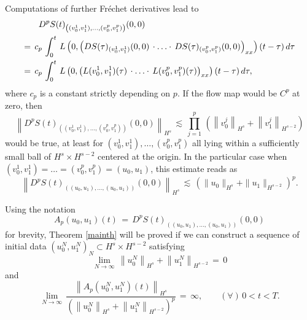 \documentclass{amsart}
\begin{document}
Computations of further Fr\'{e}chet derivatives lead to 
\begin{equation}
\aligned
 D^pS(t)&_{\left((v^1_0,v^1_1),\ldots, (v^p_0,v^p_1)\right)}(0,0)\\
=\,c_p\,\int_0^t\,L& \left( 0,\left(DS(\tau)_{(v^1_0,v^1_1)}(0,0)\,\cdot \ldots\cdot\,DS(\tau)_{(v^p_0,v^p_1)}(0,0)\right)_{xx}\right)(t-\tau)\,d\tau\\
=\,c_p\,\int_0^t\,L& \left( 0,\left(L(v^1_0,v^1_1)(\tau)\,\cdot \ldots\cdot\,L(v^p_0,v^p_1)(\tau)\right)_{xx}\right)(t-\tau)\,d\tau,
\endaligned
\label{dps}
\end{equation}
where $c_p$ is a constant strictly depending on $p$. If the flow map would be $C^p$ at zero, 
then 
\begin{equation}
 \left\|D^pS(t)_{\left((v^1_0,v^1_1),\ldots, (v^p_0,v^p_1)\right)}(0,0)\right\|_{H^s}\,\lesssim\,\prod_{j=1}^{p}\, \left(\left\|v^j_0\right\|_{H^s}+\left\|v^j_1\right\|_{H^{s-2}}\right)
\end{equation}
would be true, at least for $(v^1_0,v^1_1),\ldots, (v^p_0,v^p_1)$ all lying within a sufficiently small ball of $ H^s\times H^{s-2}$ centered at the origin. In the particular case when $(v^1_0,v^1_1)=\ldots= (v^p_0,v^p_1)=(u_0,u_1)$, this estimate reads as
\begin{equation}
 \left\|D^pS(t)_{\left((u_0,u_1),\ldots, (u_0,u_1)\right)}(0,0)\right\|_{H^s}\,\lesssim\,\left(\|u_0\|_{H^s}+\|u_1\|_{H^{s-2}}\right)^p.
\end{equation}

Using the notation
\[
A_p(u_0,u_1)(t)\,=\,D^pS(t)_{\left((u_0,u_1),\ldots, (u_0,u_1)\right)}(0,0)
\]
for brevity, Theorem \ref{mainth} will be proved if we can construct a sequence of initial data $\left(u^N_0,u^N_1\right)_N\subset H^s\times H^{s-2}$ satisfying
\begin{equation}
\lim_{N\to \infty}\, \left\|u_0^N\right\|_{H^{s}} + \left\|u_1^N\right\|_ {H^{s-2}}\,=\,0
\label{ivhs}
\end{equation}
and 
\begin{equation}
\lim_{N\to \infty}\, \frac{\left\|A_{p}(u_0^N,u_1^N)(t)\right\|_{H^s}}{\left(\left\|u_0^N\right\|_{H^{s}} + \left\|u_1^N\right\|_ {H^{{s}-2}}\right)^p}\,=\,\infty, \qquad (\forall)\, 0 < t < T.
\label{ratio}
\end{equation}
\end{document}
